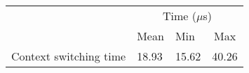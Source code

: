 \begin{tabular}{llll}
  & \multicolumn{3}{c}{Time ($\mu$s)}                             \\ \cline{2-4} 
  & \multicolumn{1}{c}{Mean} & Min  & \multicolumn{1}{c}{Max} \\ \cline{2-4} 
Context switching time & 18.93                     & 15.62 & 40.26                    \\
\end{tabular}